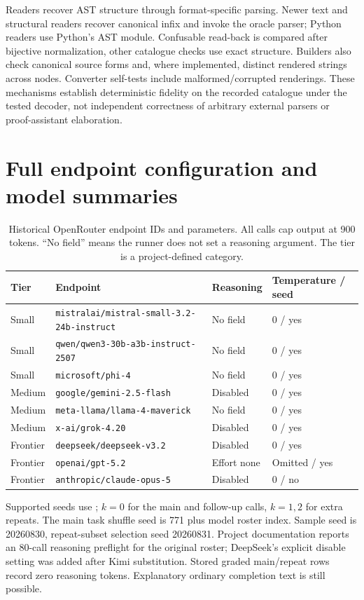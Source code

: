 \documentclass{article}
\newcommand{\code}[1]{\texttt{\detokenize{#1}}}
\begin{document}
Readers recover AST structure through format-specific parsing. Newer text and
structural readers recover canonical infix and invoke the oracle parser; Python
readers use Python's AST module. Confusable read-back is compared after
bijective normalization, other catalogue checks use exact structure. Builders
also check canonical source forms and, where implemented, distinct rendered
strings across nodes. Converter self-tests include malformed/corrupted
renderings. These mechanisms establish deterministic fidelity on the recorded
catalogue under the tested decoder, not independent correctness of arbitrary
external parsers or proof-assistant elaboration.

\section{Full endpoint configuration and model summaries}
\label{app:models}

\begin{table}[h]
\centering
\small
\caption{Historical OpenRouter endpoint IDs and parameters. All calls cap
output at 900 tokens. ``No field'' means the runner does not set a reasoning
argument. The tier is a project-defined category.}
\begin{tabularx}{\linewidth}{lXll}
\toprule
Tier & Endpoint & Reasoning & Temperature / seed \\
\midrule
Small & \nolinkurl{mistralai/mistral-small-3.2-24b-instruct} & No field & 0 / yes \\
Small & \nolinkurl{qwen/qwen3-30b-a3b-instruct-2507} & No field & 0 / yes \\
Small & \nolinkurl{microsoft/phi-4} & No field & 0 / yes \\
Medium & \nolinkurl{google/gemini-2.5-flash} & Disabled & 0 / yes \\
Medium & \nolinkurl{meta-llama/llama-4-maverick} & No field & 0 / yes \\
Medium & \nolinkurl{x-ai/grok-4.20} & Disabled & 0 / yes \\
Frontier & \nolinkurl{deepseek/deepseek-v3.2} & Disabled & 0 / yes \\
Frontier & \nolinkurl{openai/gpt-5.2} & Effort none & Omitted / yes \\
Frontier & \nolinkurl{anthropic/claude-opus-5} & Disabled & 0 / no \\
\bottomrule
\end{tabularx}
\end{table}

Supported seeds use \code{20260830 + k}; $k=0$ for the main and follow-up
calls, $k=1,2$ for extra repeats. The main task shuffle seed is 771 plus model
roster index. Sample seed is 20260830, repeat-subset selection seed 20260831.
Project documentation reports an 80-call reasoning preflight for the original
roster; DeepSeek's explicit disable setting was added after Kimi substitution.
Stored graded main/repeat rows record zero reasoning tokens. Explanatory ordinary
completion text is still possible.
\end{document}
